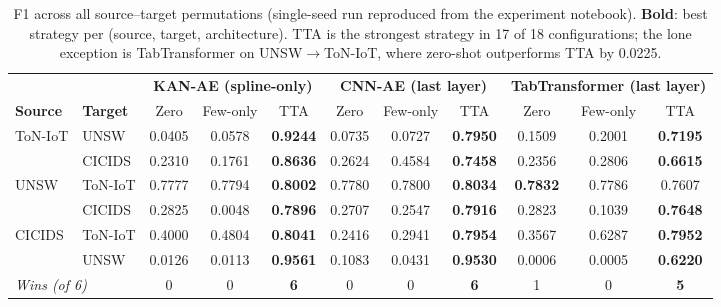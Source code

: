 \documentclass[10pt, conference, letterpaper]{IEEEtran}
\begin{document}
\begin{table}[t]
\centering
\caption{F1 across all source--target permutations (single-seed run reproduced from the experiment notebook).
  \textbf{Bold}: best strategy per (source, target, architecture).
  TTA is the strongest strategy in 17 of 18 configurations; the lone exception is TabTransformer on UNSW$\rightarrow$ToN-IoT, where zero-shot outperforms TTA by 0.0225.}
\label{tab:main_results}
\begin{tabular}{l|l|ccc|ccc|ccc}
\toprule
& & \multicolumn{3}{c|}{\textbf{KAN-AE (spline-only)}} & \multicolumn{3}{c|}{\textbf{CNN-AE (last layer)}} & \multicolumn{3}{c}{\textbf{TabTransformer (last layer)}} \\
\textbf{Source} & \textbf{Target} & Zero & Few-only & TTA & Zero & Few-only & TTA & Zero & Few-only & TTA \\
\midrule
\multirow{2}{*}{ToN-IoT}
    & UNSW    & 0.0405 & 0.0578 & \textbf{0.9244} & 0.0735 & 0.0727 & \textbf{0.7950} & 0.1509 & 0.2001 & \textbf{0.7195} \\
    & CICIDS  & 0.2310 & 0.1761 & \textbf{0.8636} & 0.2624 & 0.4584 & \textbf{0.7458} & 0.2356 & 0.2806 & \textbf{0.6615} \\
\midrule
\multirow{2}{*}{UNSW}
    & ToN-IoT & 0.7777 & 0.7794 & \textbf{0.8002} & 0.7780 & 0.7800 & \textbf{0.8034} & \textbf{0.7832} & 0.7786 & 0.7607 \\
    & CICIDS  & 0.2825 & 0.0048 & \textbf{0.7896} & 0.2707 & 0.2547 & \textbf{0.7916} & 0.2823 & 0.1039 & \textbf{0.7648} \\
\midrule
\multirow{2}{*}{CICIDS}
    & ToN-IoT & 0.4000 & 0.4804 & \textbf{0.8041} & 0.2416 & 0.2941 & \textbf{0.7954} & 0.3567 & 0.6287 & \textbf{0.7952} \\
    & UNSW    & 0.0126 & 0.0113 & \textbf{0.9561} & 0.1083 & 0.0431 & \textbf{0.9530} & 0.0006 & 0.0005 & \textbf{0.6220} \\
\midrule
\multicolumn{2}{l|}{\textit{Wins (of 6)}} & 0 & 0 & \textbf{6} & 0 & 0 & \textbf{6} & 1 & 0 & \textbf{5} \\
\bottomrule
\end{tabular}
\end{table}
\end{document}
